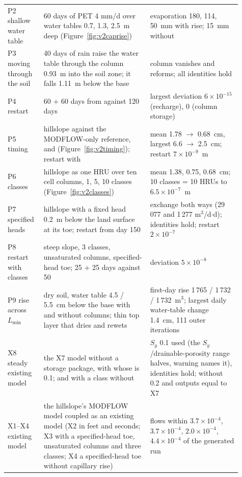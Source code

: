\begin{longtable}{P{0.13\linewidth}P{0.42\linewidth}P{0.36\linewidth}}
P2 shallow water table & 60 days of PET 4 mm/d over water tables 0.7, 1.3, 2.5~m deep (Figure~\ref{fig:v2caprise}) & evaporation 180, 114, 50~mm with rise; 15~mm without\\
P3 moving through the soil & 40 days of rain raise the water table through the column 0.93~m into the soil zone; it falls 1.11~m below the base & column vanishes and reforms; all identities hold\\
P4 restart & 60 + 60 days from  against 120 days & largest deviation $6\times10^{-15}$ (recharge), 0 (column storage)\\
P5 timing & hillslope against the MODFLOW-only reference,  and  (Figure~\ref{fig:v2timing}); restart with  & mean 1.78 $\to$ 0.68~cm, largest 6.6 $\to$ 2.5~cm; restart $7\times10^{-9}$~m\\
P6 classes & hillslope as one HRU over ten cell columns, 1, 5, 10 classes (Figure~\ref{fig:v2classes}) & mean 1.38, 0.75, 0.68~cm; 10 classes = 10 HRUs to $6.5\times10^{-7}$~m\\
P7 specified heads & hillslope with a fixed head 0.2~m below the land surface at its toe; restart from day 150 & exchange both ways (29\,077 and 1\,277 m$^3$/d$\cdot$d); identities hold; restart $2\times10^{-7}$\\
P8 restart with classes & steep slope, 3 classes, unsaturated columns, specified-head toe; 25 + 25 days against 50 & deviation $5\times10^{-8}$\\
P9 rise across $L_{\min}$ & dry soil, water table 4.5 / 5.5~cm below the base with and without columns; thin top layer that dries and rewets & first-day rise 1\,765 / 1\,732 / 1\,732~m$^3$; largest daily water-table change 1.4~cm, 111 outer iterations\\
X8 steady existing model & the X7 model without a storage package, with  whose  is 0.1; and with a class without  & $S_y$ 0.1 used (the $S_y$/drainable-porosity range halves, warning names it), identities hold; without  0.2 and outputs equal to X7\\
X1--X4 existing model & the hillslope's MODFLOW model coupled as an existing model (X2 in feet and seconds; X3 with a specified-head toe, unsaturated columns and three classes; X4 a specified-head toe without capillary rise) & flows within $3.7\times10^{-4}$, $3.7\times10^{-4}$, $2.0\times10^{-4}$, $4.4\times10^{-4}$ of the generated run\\

\end{longtable}
